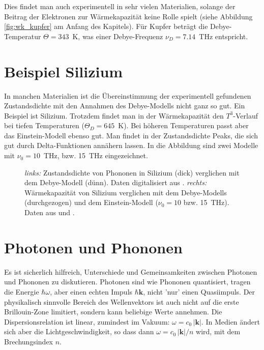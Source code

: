 Dies findet man auch experimentell in sehr vielen Materialien, solange der Beitrag der Elektronen zur Wärmekapazität keine Rolle spielt (siehe Abbildung \ref{fig:wk_kupfer} am Anfang des Kapitels). Für Kupfer beträgt die Debye-Temperatur $\Theta = 343$~K, was einer Debye-Frequenz $\nu_D = 7.14$~THz entspricht.



\section{Beispiel Silizium}

In manchen Materialien ist die Übereinstimmung der experimentell gefundenen Zustandsdichte mit den Annahmen des Debye-Modells nicht ganz so gut. Ein Beispiel ist Silizium. Trotzdem findet man in der Wärmekapazität den $T^3$-Verlauf bei tiefen Temperaturen ($\Theta_D = 645$~K). Bei höheren Temperaturen passt aber das Einstein-Modell ebenso gut. Man findet in der Zustandsdichte Peaks, die sich gut durch Delta-Funktionen annähern lassen.  In die Abbildung sind zwei Modelle mit $\nu_0 = 10$~THz, bzw. 15~THz eingezeichnet.




\begin{figure}
  \caption{ \textit{links:} Zustandsdichte von Phononen in Silizium (dick) verglichen mit dem Debye-Modell (dünn). Daten digitalisiert aus \cite{dolling66_si}. \textit{rechts:} Wärmekapazität von Silizium verglichen mit dem Debye-Modells (durchgezogen) und dem Einstein-Modell ($\nu_0=10$ bzw. 15~THz). Daten aus \cite{Flubacher59_si} und \cite{Okhotin72_si}. \label{fig:wk_Si}}
\end{figure}



\section{Photonen und Phononen}

Es ist sicherlich hilfreich, Unterschiede und Gemeinsamkeiten zwischen  Photonen und Phononen zu diskutieren. Photonen sind wie Phononen quantisiert, tragen die Energie $\hbar \omega$, aber einen echten Impuls $\hbar \mathbf{k}$, nicht 'nur' einen Quasiimpuls. Der physikalisch sinnvolle Bereich des Wellenvektors ist auch nicht auf die erste Brillouin-Zone limitiert, sondern kann beliebige Werte annehmen. Die Dispersionsrelation ist linear, zumindest im Vakuum: $\omega = c_0 \, | \mathbf{k} |$. In Medien ändert sich aber die Lichtgeschwindigkeit, so dass dann $\omega = c_0 \, | \mathbf{k} | / n$ wird, mit dem Brechungsindex $n$.

